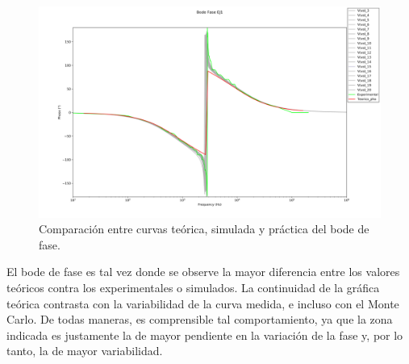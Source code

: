 \begin{figure}[H]
    \centering
    \begin{minipage}{\textwidth}
        \centering
        \includegraphics[width=\textwidth]{EJ1/Bode_Phase_EJ1.png}
        \caption{Comparaci\'on entre curvas teórica, simulada y práctica del bode de fase.}
        \label{fig: Phase Bode}
    \end{minipage}\hfill
\end{figure}
El bode de fase es tal vez donde se observe la mayor diferencia entre los valores teóricos contra los experimentales o simulados.
La continuidad de la gráfica teórica contrasta con la variabilidad de la curva medida, e incluso con el Monte Carlo.
De todas maneras, es comprensible tal comportamiento, ya que la zona indicada es justamente la de mayor pendiente en la variación de la fase y, por lo tanto, la de mayor variabilidad.

